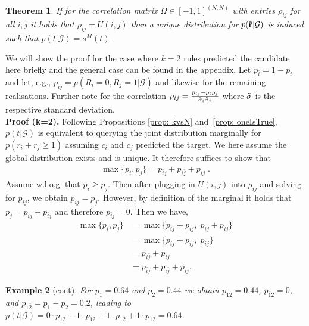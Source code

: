 \documentclass{article}
\theoremstyle{plain}
\newtheorem{theorem}{Theorem}[section]
\newtheorem{example}[theorem]{Example}
\theoremstyle{remark}
\newcommand{\atomrule}{c}
\newcommand{\vecallrules}{\mathbf{\Tilde{r}}}
\newcommand{\alltriples}{\mathcal{G}}
\begin{document}
\begin{theorem} \label{theorem: max distribution}
    If for the correlation matrix $\Omega \in [-1,1]^{(N,N)}$ with entries $\rho_{ij}$ for all $i,j$ it holds that $\rho_{ij} = U(i,j)$ then a unique distribution for  $p(\vecallrules | \alltriples)$ is induced such that $p(t | \alltriples)=s^M(t).$
\end{theorem}


\noindent We will show the proof for the case where $k=2$ rules predicted the candidate here briefly and the general case can be found in the appendix. Let $p_{\bar{i}}=1-p_{i}$ and let, e.g., $p_{\bar{i}j}=p(R_i{=}0,R_j{=}1 |{\alltriples})$ and likewise for the remaining realisations. Further note for the correlation $\rho_{ij} = \frac{p_{ij}-p_ip_j}{\Tilde{\sigma}_i \Tilde{\sigma}_j}$ where $\Tilde{\sigma}$ is the respective standard deviation. \\

\noindent\textbf{Proof (k=2).} Following Propositions \eqref{prop: kvsN} and~\eqref{prop: oneIsTrue}, $p(t | \alltriples)$ is equivalent to querying the joint distribution marginally for $p(r_i + r_j \geq 1)$ assuming $\atomrule_i$ and $\atomrule_j$ predicted the target. We here assume the global distribution exists and is unique. It therefore suffices to show that
\begin{align*}
     \max{\{p_i, p_j\}} = p_{\bar{i}j} + p_{i\bar{j}} + p_{ij} \;.
\end{align*}
Assume w.l.o.g. that $p_i \geq p_j$. Then after plugging in $U(i,j)$ into $\rho_{ij}$ and solving for $p_{ij}$, we obtain  $p_{ij} = p_j$. However, by definition of the marginal it holds that $p_j= p_{ij} + p_{\bar{i}j}$ and therefore $p_{\bar{i}j}=0$. Then we have,
\begin{align*}
     \max{\{p_i, p_j\}} &=  \max{\{ p_{i\bar{j}}+ p_{ij}, \; p_{\bar{i}j} + p_{ij}\}}\\
     &=  \max{\{ p_{i\bar{j}}+ p_{ij}, \; p_{ij}\}}\\
     &=  p_{i\bar{j}} +  p_{ij}\\
     &=  p_{\bar{i}j} + p_{i\bar{j}} + p_{ij}. \tag*{\qed}
\end{align*}


\begin{example}[cont]
    For $p_{1} = 0.64$ and $p_2=0.44$ we obtain $p_{12} = 0.44$, $p_{\bar{1}2}=0$, and $p_{1\bar{2}}=p_1-p_2=0.2$, leading to $p(t | \alltriples) = 0 \cdot p_{\bar{1}\bar{2}} + 1 \cdot p_{12} + 1 \cdot p_{1\bar{2}} + 1 \cdot p_{\bar{1}2} = 0.64$.
\end{example}
\end{document}
